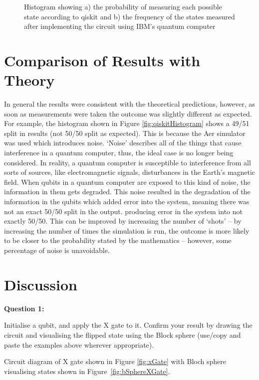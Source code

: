 \begin{figure}[h]
\begin{subfigure}[h]{0.43\textwidth}
        \caption{} 
        \label{fig:ibmHistogram}
    \end{subfigure}
    \caption{Histogram showing a) the probability of measuring each possible state according to qiskit and b) the frequency of the states measured after implementing the circuit using IBM's quantum computer} 
    \label{fig:hisogram}
\end{figure}

\section{Comparison of Results with Theory} \label{sec:comparison}
In general the results were consistent with the theoretical predictions, however, as soon as measurements were taken the outcome was slightly different as expected. For example, the histogram shown in Figure \ref{fig:qiskitHistogram} shows a 49/51 split in results (not 50/50 split as expected). This is because the Aer simulator was used which introduces noise. `Noise' describes all of the things that cause interference in a quantum computer, thus, the ideal case is no longer being considered. In reality, a quantum computer is susceptible to interference from all sorts of sources, like electromagnetic signals, 
disturbances in the Earth’s magnetic field. When qubits in a quantum computer are exposed to this kind of noise, the information in them gets degraded. This noise resulted in the degradation of the information in the qubits which added error into the system, meaning there was not an exact 50/50 split in the output. producing error in the system into not exactly 50/50. This can be improved by increasing the number of `shots' -- by increasing the number of times the simulation is run, the outcome is more likely to be closer to the probability stated by the mathematics -- however, some percentage of noise is unavoidable.

\section{Discussion} \label{sec:discussion}
\textbf{Question 1:}

Initialise a qubit, and apply the X gate to it. Confirm your result by drawing the circuit and visualising the flipped state using the Block sphere (use/copy and paste the examples above wherever appropriate).

Circuit diagram of X gate shown in Figure \ref{fig:xGate} with Bloch sphere visualising states shown in Figure~\ref{fig:bSphereXGate}.

